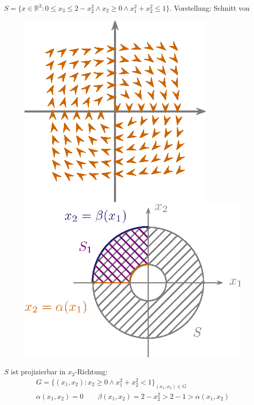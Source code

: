 \documentclass[a4paper,10pt]{scrbook}
\begin{document}
\begin{example}
  $S = \{ x \in \mathbb{R}^3 : 0 \leq x_3 \leq 2 - x_2^2 \land x_2 \geq 0 \land x_1^2 + x_2^2 \leq 1 \}$. Vorstellung: Schnitt von
  \begin{figure}[H]
    \centering
    \includegraphics[scale=0.2]{images/ana3-tmp-60}
    \hspace*{4em}
    \includegraphics[scale=0.2]{images/ana3-tmp-61}
  \end{figure}
  $S$ ist projizierbar in $x_3$-Richtung:
  \begin{gather*}
    G = \{ (x_1,x_2) : x_2 \geq 0 \land x_1^2 + x_2^2 < 1 \}_{(x_1,x_2) \in G} \\
    \alpha(x_1,x_2) = 0 \qquad \beta(x_1,x_2) = 2 - x_2^2 > 2 - 1 > \alpha(x_1,x_2)
  \end{gather*}

\end{example}
\end{document}
